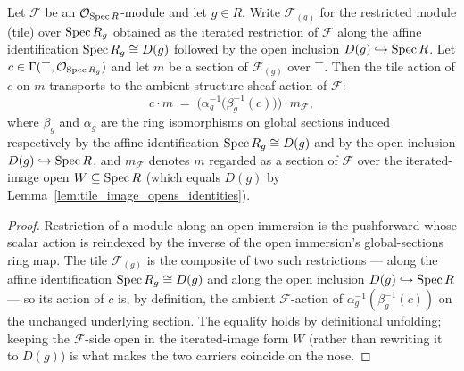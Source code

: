 \begin{lemma}\leanok
  \label{lem:modulesRestrictBasicOpen_smul_eq}
  Let \(\mathcal{F}\) be an \(\mathcal{O}_{\operatorname{Spec} R}\)-module and let \(g \in R\). Write
  \(\mathcal{F}_{(g)}\) for the restricted module (tile) over \(\operatorname{Spec} R_g\) obtained as the iterated
  restriction of \(\mathcal{F}\) along the affine identification \(\operatorname{Spec} R_g \cong D(g)\) followed by the
  open inclusion \(D(g) \hookrightarrow \operatorname{Spec} R\). Let \(c \in \Gamma(\top, \mathcal{O}_{\operatorname{Spec} R_g})\) and
  let \(m\) be a section of \(\mathcal{F}_{(g)}\) over \(\top\). Then the tile action of \(c\) on \(m\)
  transports to the ambient structure-sheaf action of \(\mathcal{F}\):
  \[
    c \cdot m \;=\; \bigl(\alpha_g^{-1}\bigl(\beta_g^{-1}(c)\bigr)\bigr) \cdot m_{\mathcal{F}},
  \]
  where \(\beta_g\) and \(\alpha_g\) are the ring isomorphisms on global sections induced respectively by
  the affine identification \(\operatorname{Spec} R_g \cong D(g)\) and by the open inclusion \(D(g) \hookrightarrow
  \operatorname{Spec} R\), and \(m_{\mathcal{F}}\) denotes \(m\) regarded as a section of \(\mathcal{F}\) over the
  iterated-image open \(W \subseteq \operatorname{Spec} R\) (which equals \(D(g)\) by
  Lemma~\ref{lem:tile_image_opens_identities}).
\end{lemma}
\begin{proof}
  \leanok
  Restriction of a module along an open immersion is the pushforward whose scalar action is reindexed by
  the inverse of the open immersion's global-sections ring map. The tile \(\mathcal{F}_{(g)}\) is the
  composite of two such restrictions --- along the affine identification \(\operatorname{Spec} R_g \cong D(g)\) and along
  the open inclusion \(D(g) \hookrightarrow \operatorname{Spec} R\) --- so its action of \(c\) is, by definition, the
  ambient \(\mathcal{F}\)-action of \(\alpha_g^{-1}(\beta_g^{-1}(c))\) on the unchanged underlying section.
  The equality holds by definitional unfolding; keeping the \(\mathcal{F}\)-side open in the
  iterated-image form \(W\) (rather than rewriting it to \(D(g)\)) is what makes the two carriers
  coincide on the nose.
\end{proof}

